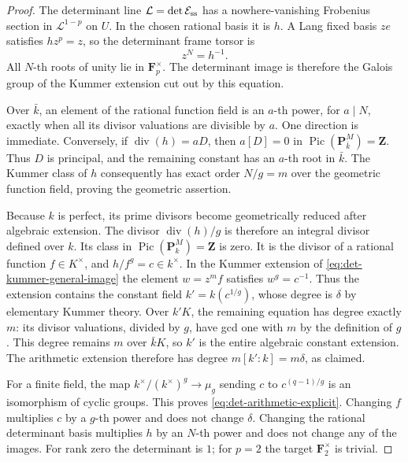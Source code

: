 \begin{proof}
The determinant line $\mathcal L=\det\mathcal E_{\rm ss}$
has a nowhere-vanishing Frobenius section in
$\mathcal L^{1-p}$ on $U$.  In the chosen rational basis
it is $h$.  A Lang fixed basis $ze$ satisfies
$h z^p=z$, so the determinant frame torsor is
\begin{equation}\label{eq:det-kummer-general-image}
 z^N=h^{-1}.
\end{equation}
All $N$-th roots of unity lie in $\mathbf F_p^\times$.
The determinant image is therefore the Galois group
of the Kummer extension cut out by this equation.

Over $\bar k$, an element of the rational function field
is an $a$-th power, for $a\mid N$, exactly when all its
divisor valuations are divisible by $a$.
One direction is immediate.  Conversely, if
$\operatorname{div}(h)=aD$, then $a[D]=0$ in
$\operatorname{Pic}(\mathbf P^M_{\bar k})=\mathbf Z$.
Thus $D$ is principal, and the remaining constant has
an $a$-th root in $\bar k$.
The Kummer class of $h$ consequently has exact order
$N/g=m$ over the geometric function field, proving the
geometric assertion.

Because $k$ is perfect, its prime divisors become
geometrically reduced after algebraic extension.
The divisor $\operatorname{div}(h)/g$ is therefore an
integral divisor defined over $k$.
Its class in $\operatorname{Pic}(\mathbf P^M_k)=\mathbf Z$
is zero.  It is the divisor of a rational function
$f\in K^\times$, and $h/f^g=c\in k^\times$.
In the Kummer extension of \eqref{eq:det-kummer-general-image}
the element $w=z^m f$ satisfies $w^g=c^{-1}$.
Thus the extension contains the constant field
$k'=k(c^{1/g})$, whose degree is $\delta$ by elementary
Kummer theory.  Over $k'K$, the remaining equation has
degree exactly $m$: its divisor valuations, divided by
$g$, have gcd one with $m$ by the definition of $g$.
This degree remains $m$ over $\bar k K$, so $k'$ is
the entire algebraic constant extension.
The arithmetic extension therefore has degree
$m[k':k]=m\delta$, as claimed.

For a finite field, the map
$k^\times/(k^\times)^g\to\mu_g$ sending
$c$ to $c^{(q-1)/g}$ is an isomorphism of cyclic groups.
This proves \eqref{eq:det-arithmetic-explicit}.
Changing $f$ multiplies $c$ by a $g$-th power and does
not change $\delta$.  Changing the rational determinant
basis multiplies $h$ by an $N$-th power and does not
change any of the images.
For rank zero the determinant is $1$; for $p=2$ the
target $\mathbf F_2^\times$ is trivial.
\end{proof}

